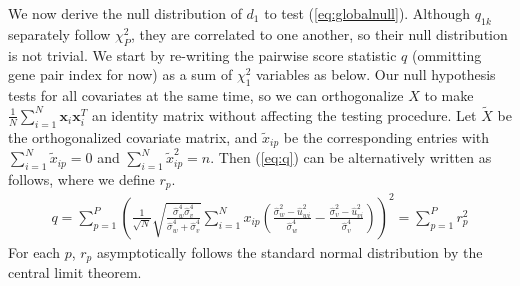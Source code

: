 \documentclass[aap,authoryear, preprint]{imsart}
\numberwithin{equation}{section}
\theoremstyle{plain}
\begin{document}
We now derive the null distribution of $d_1$ to test (\ref{eq:globalnull}). Although ${q}_{1k}$ separately follow $\chi_{P}^2$, they are correlated to one another, so their null distribution is not trivial. We start by re-writing the pairwise score statistic $q$ (ommitting gene pair index for now) as a sum of $\chi_1^2$ variables as below. Our null hypothesis tests for all covariates at the same time, so we can orthogonalize $X$ to make $\frac{1}{N} \sum_{i=1}^{N} \bm{x}_i \bm{x}_i^T$ an identity matrix without affecting the testing procedure. Let $\tilde{X}$ be the orthogonalized covariate matrix, and $\tilde{x}_{ip}$ be the corresponding entries with $\sum_{i=1}^{N}\tilde{x}_{ip} = 0$ and $\sum_{i=1}^{N} \tilde{x}_{ip}^2  = n$. Then (\ref{eq:q}) can be alternatively written as follows, where we define $r_{p}.$
\begin{align}
q = \sum_{p=1}^{P}
 \left(\frac{1}{\sqrt{N}}
 \sqrt{\frac{\hat{\sigma}_w^4 \hat{\sigma}_v^4}{\hat{\sigma}_w^4 + \hat{\sigma}_v^4}}
 \sum_{i=1}^{N} x_{ip} \left( \frac{\hat{\sigma}_w^2 - \hat{u}_{wi}^2}{\hat{\sigma}_w^4}
 - \frac{\hat{\sigma}_v^2 - \hat{u}_{vi}^2}{\hat{\sigma}_v^4}
 \right)
\right)^2 = \sum_{p=1}^{P}r_p^2
\label{eq:r}
\end{align}
For each $p$, $r_p$ asymptotically follows the standard normal distribution by the central limit theorem. 
\end{document}
